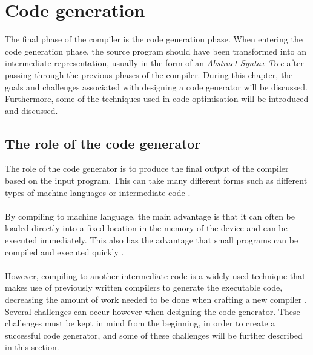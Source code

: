 \chapter{Code generation}\label{ch:CodeGenerationTheory}
The final phase of the compiler is the code generation phase.
When entering the code generation phase, the source program should have been transformed into an intermediate representation, usually in the form of an \textit{Abstract Syntax Tree} after passing through the previous phases of the compiler.
During this chapter, the goals and challenges associated with designing a code generator will be discussed. 
Furthermore, some of the techniques used in code optimisation will be introduced and discussed.

\section{The role of the code generator}
The role of the code generator is to produce the final output of the compiler based on the input program. This can take many different forms such as different types of machine languages or intermediate code \cite{Dragon}. 
\\\\
By compiling to machine language, the main advantage is that it can often be loaded directly into a fixed location in the memory of the device and can be executed immediately. This also has the advantage that small programs can be compiled and executed quickly \cite{Dragon}.
\\\\
However, compiling to another intermediate code is a widely used technique that makes use of previously written compilers to generate the executable code, decreasing the amount of work needed to be done when crafting a new compiler \cite{Dragon}.
\\
Several challenges can occur however when designing the code generator. 
These challenges must be kept in mind from the beginning, in order to create a successful code generator, and some of these challenges will be further described in this section.



